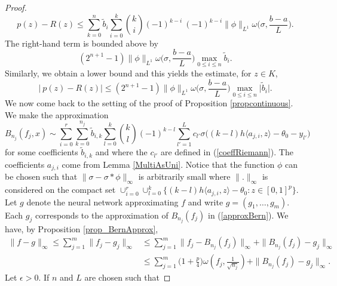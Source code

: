 \documentclass[anon,12pt]{colt2021} %
\begin{document}
\begin{proof}
\begin{equation*}
    p(z) -  R(z) \leq \sum_{k=0}^{n} \tilde b_{i} \sum_{i=0}^{k} 
    \binom{k}{i}
    (-1)^{k-i} \ (-1)^{k-i} \| \phi \|_{L^{1}} \omega \big( \sigma, \frac{b-a}{L}\big).
\end{equation*}
The right-hand term is bounded above by
\begin{equation*}
    (2^{n+1}-1) \| \phi \|_{L^{1}} \omega \big( \sigma, \frac{b-a}{L}\big) \max_{0 \leq i \leq n} \tilde b_{i}.
\end{equation*}
Similarly, we obtain a lower bound and this yields the estimate, for $z \in K$,
\begin{equation} \label{errorBound}
    \big \vert \ p(z) -  R(z) \big \vert \leq (2^{n+1}-1) \| \phi \|_{L^{1}} \omega \big( \sigma, \frac{b-a}{L}\big) \max_{0 \leq i \leq n} \vert \tilde b_{i} \vert .
\end{equation}
We now come back to the setting of the proof of Proposition \ref{propcontinuous}. We make the approximation
\begin{equation} \label{approxBern}
    B_{n_{j}}(f_{j}, x) \sim \sum_{i=0}^{r} \sum_{k=0}^{n_{j}} \tilde b_{i,k} \sum_{l=0}^{k} 
    \binom{k}{l}
    (-1)^{k-l} \sum_{l'=1}^{L} c_{l'} \sigma \big( (k-l)h\langle a_{j,i}, z \rangle - \theta_{0} - y_{l'} \big)
\end{equation}
for some coefficients $\tilde b_{i,k}$ and where the $c_{l'}$ are defined in (\ref{coeffRiemann}). The coefficients $a_{j,i}$ come from Lemma \ref{MultiAsUni}. Notice that the function $\phi$ can be chosen such that $\| \sigma - \sigma * \phi \|_{\infty}$ is arbitrarily small where $\| . \|_{\infty}$ is considered on the compact set
$\cup_{i=0}^{r} \cup_{l=0}^{k}  \big \{ (k-l)h \langle a_{j,i}, z\rangle - \theta_{0}: z \in [0,1]^{p} \big \}$.
Let $g$ denote the neural network approximating $f$ and write $g=(g_{1}, \dots, g_{m})$. Each $g_{j}$ corresponds to the approximation of $B_{n_{j}}(f_{j})$ in (\ref{approxBern}). We have, by Proposition \ref{prop_BernApprox},
\begin{align*}
    \| f - g \|_{\infty} \leq \sum_{j=1}^{m} \| f_{j} - g_{j} \|_{\infty} 
     &\leq \sum_{j=1}^{m} \| f_{j} - B_{n_{j}}(f_{j}) \|_{\infty} +  \|B_{n_{j}}(f_{j}) - g_{j} \|_{\infty} \\
     & \leq  \sum_{j=1}^{m} \bigg( 1 + \frac{p}{4}\bigg) \omega(f_{j}, \frac{1}{\sqrt{n_{j}}})  + \|B_{n_{j}}(f_{j}) - g_{j} \|_{\infty}.
\end{align*}
Let $\epsilon > 0$. If $n$ and $L$ are chosen such that

\end{proof}
\end{document}
